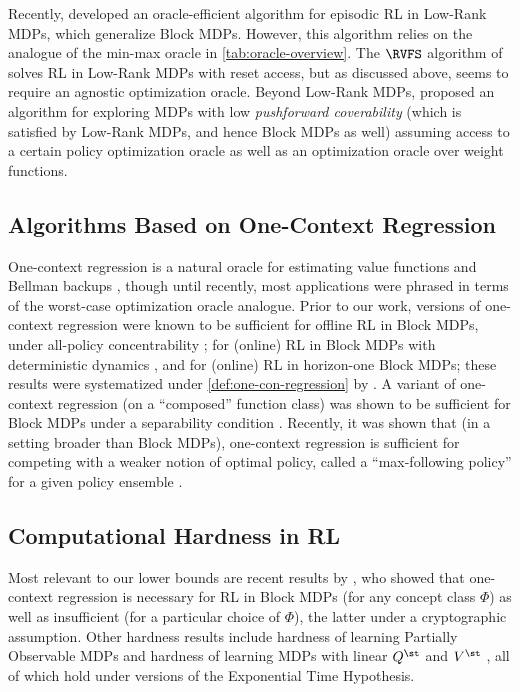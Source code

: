 Recently, \cite{mhammedi2023efficient} developed an oracle-efficient algorithm for episodic RL in Low-Rank MDPs, which generalize Block MDPs. However, this algorithm relies on the analogue of the min-max oracle in \cref{tab:oracle-overview}. The $\RVFS$ algorithm of \cite{mhammedi2024power} solves RL in Low-Rank MDPs with reset access, but as discussed above, seems to require an agnostic optimization oracle. Beyond Low-Rank MDPs, \cite{amortila2024scalable} proposed an algorithm for exploring MDPs with low \emph{pushforward coverability} (which is satisfied by Low-Rank MDPs, and hence Block MDPs as well) assuming access to a certain policy optimization oracle as well as an optimization oracle over weight functions. 

\subsection{Algorithms Based on One-Context Regression}\label{sec:related-ocr}

One-context regression is a natural oracle for estimating value functions and Bellman backups \citep{ernst2005tree,mhammedi2023representation,golowich2024exploration}, though until recently, most applications were phrased in terms of the worst-case optimization oracle analogue. Prior to our work, versions of one-context regression were known to be sufficient for offline RL in Block MDPs, under all-policy concentrability \citep{chen2019information}; for (online) RL in Block MDPs with deterministic dynamics \citep{efroni2021provable}, and for (online) RL in horizon-one Block MDPs; these results were systematized under \cref{def:one-con-regression} by \cite{golowich2024exploration}. A variant of one-context regression (on a ``composed'' function class) was shown to be sufficient for Block MDPs under a separability condition \citep{du2019provably}. Recently, it was shown that (in a setting broader than Block MDPs), one-context regression is sufficient for competing with a weaker notion of optimal policy, called a ``max-following policy'' for a given policy ensemble \citep{hussing2024oracle}.

\subsection{Computational Hardness in RL}\label{sec:related-hardness}

Most relevant to our lower bounds are recent results by \cite{golowich2024exploring,golowich2023planning}, who showed that one-context regression is necessary for RL in Block MDPs (for any concept class $\Phi$) as well as insufficient (for a particular choice of $\Phi$), the latter under a cryptographic assumption. Other hardness results include hardness of learning Partially Observable MDPs \citep{papadimitriou1987complexity,jin2020sample,golowich2023planning} and hardness of learning MDPs with linear $Q^\st$ and $V^\st$ \citep{kane2022computational,liu2023exponential}, all of which hold under versions of the Exponential Time Hypothesis.






